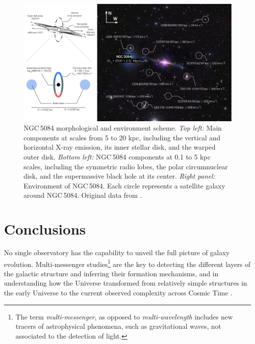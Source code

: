 \documentclass[modern]{CORE-AAS/aastex631}
\begin{document}
{\begin{figure}[t!]
\begin{center}
\includegraphics[trim={0 0 0 0}, clip, width=\textwidth]{FIGURES/NGC5084_environment_v2.png}
\caption{NGC\,5084 morphological and environment scheme. \emph{Top left:} Main components at scales from 5 to 20 kpc, including the vertical and horizontal X-ray emission, its inner stellar disk, and the warped outer disk. \emph{Bottom left:} NGC\,5084 components at 0.1 to 5 kpc scales, including the symmetric radio lobes, the polar circumnuclear disk, and the supermassive black hole at its center. \emph{Right panel:} Environment of NGC\,5084. Each circle represents a satellite galaxy around NGC\,5084. Original data from \citet{carignan+1997aj113_1585}.} 
\label{fig:NGC5084_environment}
\end{center}
\end{figure}

\section{Conclusions} \label{sec:CON}

No single observatory has the capability to unveil the full picture of galaxy evolution. Multi-messenger studies\footnote{The term \emph{multi-messenger}, as opposed to \emph{multi-wavelength} includes new tracers of astrophysical phenomena, such as gravitational waves, not associated to the detection of light.} are the key to detecting the different layers of the galactic structure and inferring their formation mechanisms, and in understanding how the Universe transformed from relatively simple structures in the early Universe to the current observed complexity across Cosmic Time  \citep{beckman2021book}. \par 

}
\end{document}
